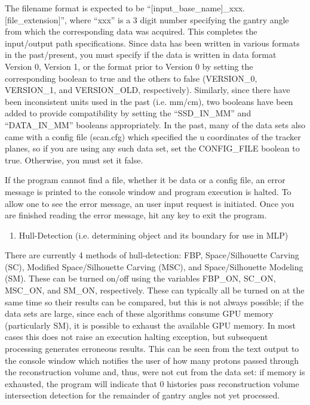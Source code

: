 \documentclass{article}
\begin{document}
The filename format is expected to be ``[input\_base\_name]\_xxx.[file\_extension]'', where ``xxx'' is a 3 digit number specifying the gantry angle from which the corresponding data was acquired.  This completes the input/output path specifications.  Since data has been written in various formats in the past/present, you must specify if the data is written in data format Version 0, Version 1, or the format prior to Version 0 by setting the corresponding boolean to true and the others to false (VERSION\_0, VERSION\_1, and VERSION\_OLD, respectively).  Similarly, since there have been inconsistent units used in the past (i.e. mm/cm), two booleans have been added to provide compatibility by setting the ``SSD\_IN\_MM'' and ``DATA\_IN\_MM'' booleans appropriately.  In the past, many of the data sets also came with a config file (scan.cfg) which specified the u coordinates of the tracker planes, so if you are using any such data set, set the CONFIG\_FILE boolean to true.  Otherwise, you must set it false.

If the program cannot find a file, whether it be data or a config file, an error message is printed to the console window and program execution is halted.  To allow one to see the error message, an user input request is initiated.  Once you are finished reading the error message, hit any key to exit the program.

\begin{enumerate}[label = (\arabic*), leftmargin = 0.0cm, resume = section]
\bfseries
\item Hull-Detection (i.e. determining object and its boundary for use in MLP)
\end{enumerate}
There are currently 4 methods of hull-detection: FBP, Space/Silhouette Carving (SC), Modified Space/Silhouette Carving (MSC), and Space/Silhouette Modeling (SM).  These can be turned on/off using the variables FBP\_ON, SC\_ON, MSC\_ON, and SM\_ON, respectively.  These can typically all be turned on at the same time so their results can be compared, but this is not always possible; if the data sets are large, since each of these algorithms consume GPU memory (particularly SM), it is possible to exhaust the available GPU memory.  In most cases this does not raise an execution halting exception, but subsequent processing generates erroneous results.  This can be seen from the text output to the console window which notifies the user of how many protons passed through the reconstruction volume and, thus, were not cut from the data set: if memory is exhausted, the program will indicate that 0 histories pass reconstruction volume intersection detection for the remainder of gantry angles not yet processed.
\end{document}
